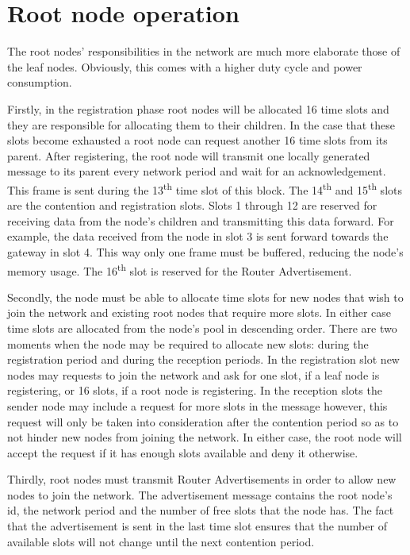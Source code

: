 \section{Root node operation}
\label{sec:root_node_operation}

The root nodes' responsibilities in the network are much more elaborate those
of the leaf nodes. Obviously, this comes with a higher duty cycle and power
consumption. 

Firstly, in the registration phase root nodes will be allocated 16 time slots
and they are responsible for allocating them to their children. In the case
that these slots become exhausted a root node can request another 16 time slots
from its parent. After registering, the root node will transmit one locally
generated message to its parent every network period and wait for an
acknowledgement.  This frame is sent during the 13\textsuperscript{th} time
slot of this block.  The 14\textsuperscript{th} and 15\textsuperscript{th}
slots are the contention and registration slots. Slots 1 through 12 are
reserved for receiving data from the node's children and transmitting this data
forward. For example, the data received from the node in slot 3 is sent forward
towards the gateway in slot 4.  This way only one frame must be buffered,
reducing the node's memory usage. The 16\textsuperscript{th} slot is reserved
for the Router Advertisement.

Secondly, the node must be able to allocate time slots for new nodes that wish
to join the network and existing root nodes that require more slots. In either
case time slots are allocated from the node's pool in descending order. There
are two moments when the node may be required to allocate new slots: during the
registration period and during the reception periods. In the registration slot
new nodes may requests to join the network and ask for one slot, if a leaf node
is registering, or 16 slots, if a root node is registering. In the reception
slots the sender node may include a request for more slots in the message
however, this request will only be taken into consideration after the
contention period so as to not hinder new nodes from joining the network. In
either case, the root node will accept the request if it has enough slots
available and deny it otherwise.  

Thirdly, root nodes must transmit Router Advertisements in order to allow new
nodes to join the network. The advertisement message contains the root node's
id, the network period and the number of free slots that the node has. The fact
that the advertisement is sent in the last time slot ensures that the number of
available slots will not change until the next contention period.

